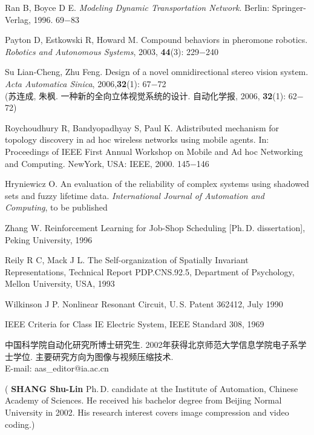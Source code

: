 \documentclass{Style/aas}
\begin{document}
\begin{multicols}{2}
\begin{thebibliography}{99}
     Ran B, Boyce D E. {\sl Modeling Dynamic Transportation Network}.
    Berlin: Springer-Verlag, 1996. 69$-$83
  
     Payton D, Estkowski R, Howard M. Compound behaviors in pheromone robotics. {\sl Robotics and Autonomous Systems}, 2003, {\bf 44}(3): 229$-$240

     Su Lian-Cheng, Zhu Feng. Design of a novel omnidirectional stereo vision system. {\sl  Acta Automatica Sinica}, 2006,{\bf 32}(1): 67$-$72\\ (苏连成, 朱枫. 一种新的全向立体视觉系统的设计. 自动化学报, 2006, {\bf 32}(1): 62$-$72)

     Roychoudhury R, Bandyopadhyay S, Paul K. Adistributed mechanism for topology discovery in ad hoc wireless networks using mobile agents. In: Proceedings of IEEE First Annual Workshop on Mobile and Ad hoc Networking and Computing. NewYork, USA: IEEE, 2000. 145$-$146

     Hryniewicz O. An evaluation of the reliability of complex systems using shadowed sets and fuzzy lifetime data. {\sl International Journal of Automation and Computing}, to be published

     Zhang W. Reinforcement Learning for Job-Shop Scheduling [Ph.\,D.
        dissertation], Peking University, 1996


     Reily R C, Mack J L. The Self-organization of Spatially Invariant
    Representations, Technical Report PDP.CNS.92.5, Department of
    Psychology, Mellon University, USA, 1993

     Wilkinson J P. Nonlinear Resonant Circuit, U.\,S. Patent 362412, July 1990

     IEEE Criteria for Class IE Electric System, IEEE Standard 308, 1969
  \end{thebibliography}

  \begin{biography}
    \quad
    中国科学院自动化研究所博士研究生.
    2002年获得北京师范大学信息学院电子系学士学位.
    主要研究方向为图像与视频压缩技术.\\E-mail: aas\_editor@ia.ac.cn

    \noindent({\bf
      SHANG Shu-Lin
    }\quad
    Ph.\,D. candidate at the
    Institute of Automation, Chinese Academy of Sciences. He received
    his bachelor degree from Beijing Normal University in 2002. His research
    interest covers image compression and video coding.)
  \end{biography}


\end{multicols}
\end{document}
